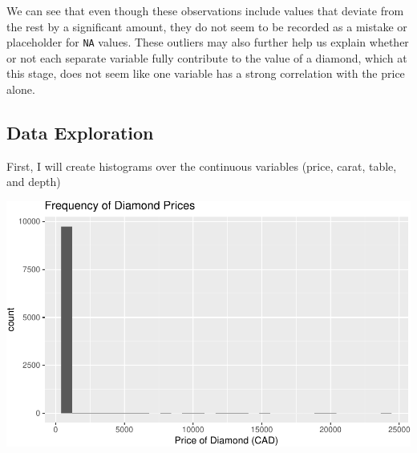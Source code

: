 \documentclass[
]{article}
\begin{document}
\begin{table}[H]

\caption{\label{tab:unnamed-chunk-3}Potential Outliers}
\centering
{}
\end{table}

We can see that even though these observations include values that
deviate from the rest by a significant amount, they do not seem to be
recorded as a mistake or placeholder for \texttt{NA} values. These
outliers may also further help us explain whether or not each separate
variable fully contribute to the value of a diamond, which at this
stage, does not seem like one variable has a strong correlation with the
price alone.

\hypertarget{data-exploration}{%
\subsection{Data Exploration}\label{data-exploration}}

First, I will create histograms over the continuous variables (price,
carat, table, and depth)

\begin{center}\includegraphics[width=0.8\linewidth]{Methods_and_Results_files/figure-latex/unnamed-chunk-4-1} \end{center}
\end{document}
